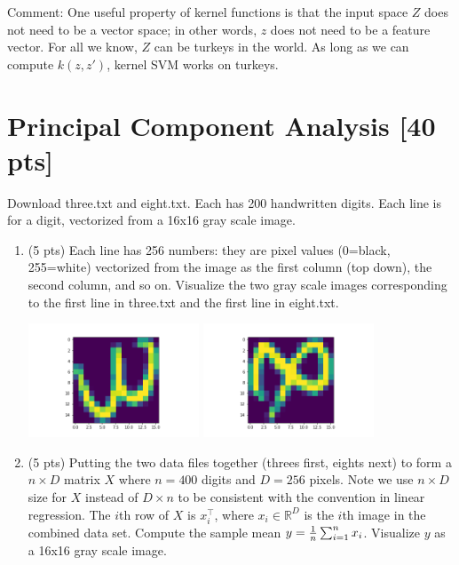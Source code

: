 \documentclass[a4paper]{article}
\theoremstyle{definition}
\def\R{\mathbb R}
\newenvironment{soln}{
    \leavevmode\color{blue}\ignorespaces
}{}
\begin{document}
Comment: One useful property of kernel functions is that the input space $Z$ does not need to be a vector space; in other words, $z$ does not need to be a feature vector.  For all we know, $Z$ can be turkeys in the world.  As long as we can compute $k(z,z')$, kernel SVM works on turkeys.

\section{Principal Component Analysis [40 pts]}
Download three.txt and eight.txt.  Each has 200 handwritten digits.  Each line is for a digit, vectorized from a 16x16 gray scale image.  
\begin{enumerate}
\item (5 pts) Each line has 256 numbers: they are pixel values (0=black, 255=white) vectorized from the image as the first column (top down), the second column, and so on.
Visualize the two gray scale images corresponding to the first line in three.txt and the first line in eight.txt.

\begin{soln}
\includegraphics[width=0.4\textwidth]{three.png}
\includegraphics[width=0.4\textwidth]{eight.png}
\end{soln}

\item (5 pts) Putting the two data files together (threes first, eights next) to form a $n \times D$ matrix $X$ where $n=400$ digits and $D=256$ pixels.  Note we use $n\times D$ size for $X$ instead of $D\times n$ to be consistent with the convention in linear regression.   The $i$th row of $X$ is $x_i^\top$, where $x_i \in \R^D$ is the $i$th image in the combined data set.
Compute the sample mean $y = {1\over n} \sum_{i=1}^n x_i$.
Visualize $y$ as a 16x16 gray scale image.


\end{enumerate}
\end{document}
